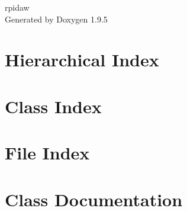 \documentclass[twoside]{book}
\newcommand{\+}{\discretionary{\mbox{\scriptsize$\hookleftarrow$}}{}{}}
\newcommand{\clearemptydoublepage}{%
    \newpage{\pagestyle{empty}\cleardoublepage}%
  }
\begin{document}
  \raggedbottom
    \hypersetup{pageanchor=false,
                bookmarksnumbered=true,
                pdfencoding=unicode
               }
  \begin{titlepage}
  \vspace*{7cm}
  \begin{center}%
  {\Large rpidaw}\\
  \vspace*{1cm}
  {\large Generated by Doxygen 1.9.5}\\
  \end{center}
  \end{titlepage}
  \clearemptydoublepage
  \tableofcontents
  \clearemptydoublepage
  \hypersetup{pageanchor=true}
\chapter{Hierarchical Index}

\chapter{Class Index}

\chapter{File Index}

\chapter{Class Documentation}




























\end{document}
